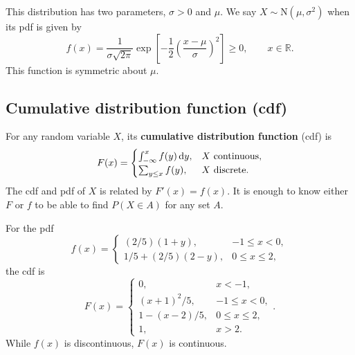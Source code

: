 \documentclass[letter-paper]{tufte-book}
\newenvironment{example}[1][Example]{\begin{trivlist}
\item[\hskip \labelsep {\bfseries #1}]}{\end{trivlist}}
\newcommand\Def[1]{\textbf{#1}}
\begin{document}
This distribution has two parameters, $\sigma>0$ and $\mu$. We say
$X\sim\mbox{N}(\mu,\sigma^2)$ when its pdf is given by
\begin{equation*}
  f(x) = \frac{1}{\sigma\sqrt{2\pi}}\exp\left[
  -\frac{1}{2}\left(\frac{x-\mu}{\sigma}\right)^2\right]\geq0,
  \qquad x\in\mathbb{R}.
\end{equation*}
This function is symmetric about $\mu$.


\subsection{Cumulative distribution function (cdf)}

For any random variable $X$, its \Def{cumulative distribution function}
(cdf) is
\begin{equation*}
  F(x) = \begin{cases} \int_{-\infty}^x f(y)\, \mathrm{d}y, & 
  X\ \textnormal{continuous},\\
  \sum_{y\leq x} f(y), & X\ \textnormal{discrete}.\end{cases}
\end{equation*}
The cdf and pdf of $X$ is related by $F'(x) = f(x)$. It is enough to know either
$F$ or $f$ to be able to find $P(X\in A)$ for any set $A$.
\begin{example}
  For the pdf
  \begin{equation*}
    f(x) = \begin{cases}(2/5)(1+y), & -1\leq x<0,\\
    1/5 + (2/5)(2-y), & 0\leq x\leq 2, \end{cases}
  \end{equation*}
  the cdf is
  \begin{equation*}
    F(x) = \begin{cases} 0, & x<-1,\\
    (x+1)^2/5, & -1\leq x < 0,\\
    1-(x-2)/5, & 0\leq x \leq2,\\
    1, & x>2. \end{cases}.
  \end{equation*}
  While $f(x)$ is discontinuous, $F(x)$ is continuous.
\end{example}
\end{document}
